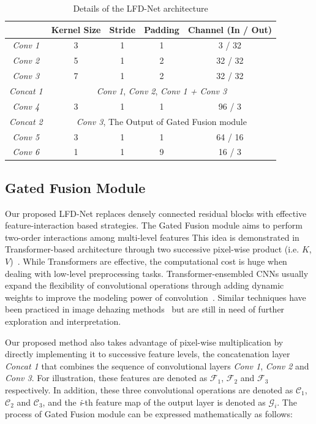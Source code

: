 \documentclass[lettersize,journal]{IEEEtran}
\begin{document}
\begin{table}[pth]
    \caption{Details of the LFD-Net architecture\label{tab:table1}}
    \centering
    \begin{tabular}{ccccc}
    \hline
      & Kernel Size & Stride & Padding & Channel (In / Out)\\
    \hline
    \textit{Conv 1} & 3 & 1 & 1 & 3 / 32\\
    \textit{Conv 2} & 5 & 1 & 2 & 32 / 32\\
    \textit{Conv 3} & 7 & 1 & 2 & 32 / 32\\
    \textit{Concat 1} &
    \multicolumn{4}{c}{\textit{Conv 1}, \textit{Conv 2}, \textit{Conv 1 + Conv 3}}\\
    \textit{Conv 4} & 3 & 1 & 1 & 96 / 3\\
    \textit{Concat 2} &
    \multicolumn{4}{c}{\textit{Conv 3}, The Output of Gated Fusion module}\\
    \textit{Conv 5} & 3 & 1 & 1 & 64 / 16\\
    \textit{Conv 6} & 1 & 1 & 9 & 16 / 3\\
    \hline
    \end{tabular}
\end{table}

\subsection{Gated Fusion Module}
Our proposed LFD-Net replaces densely connected residual blocks with effective feature-interaction based strategies. The Gated Fusion module aims to perform two-order interactions among multi-level features This idea is demonstrated in Transformer-based architecture through two successive pixel-wise product (i.e. $K$, $V$)~\cite{vaswani2017attention}. While Transformers are effective, the computational cost is huge when dealing with low-level preprocessing tasks. Transformer-ensembled CNNs usually expand the flexibility of convolutional operations through adding dynamic weights to improve the modeling power of convolution~\cite{hu2018squeeze, chen2020dynamic, rao2022hornet}. Similar techniques have been practiced in image dehazing methods~\cite{ren2018gated, chen2019gated} but are still in need of further exploration and interpretation. 

Our proposed method also takes advantage of pixel-wise multiplication by directly implementing it to successive feature levels, the concatenation layer \textit{Concat 1} that combines the sequence of convolutional layers \textit{Conv 1}, \textit{Conv 2} and \textit{Conv 3}. For illustration, these features are denoted as $\mathcal{F}_1$, $\mathcal{F}_2$ and $\mathcal{F}_3$ respectively. In addition, these three convolutional operations are denoted as $\mathcal{C}_1$, $\mathcal{C}_2$ and $\mathcal{C}_3$, and the \textit{i}-th feature map of the output layer is denoted as $\mathcal{G}_i$. The process of Gated Fusion module can be expressed mathematically as follows:
\end{document}
